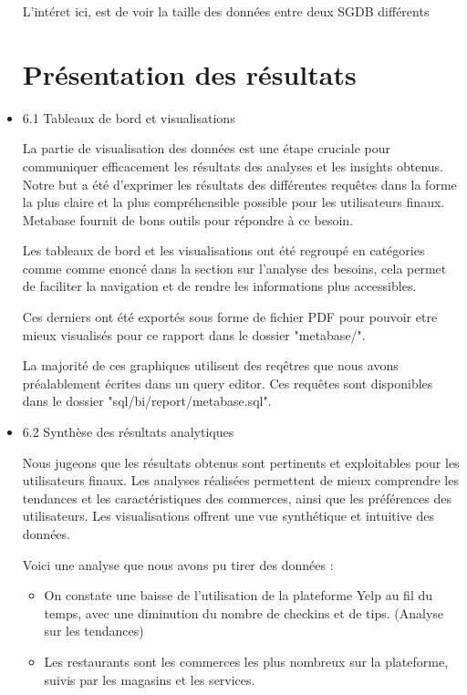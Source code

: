 \begin{itemize}
L'intéret ici, est de voir la taille des données entre deux SGDB différents


\chapter*{Présentation des résultats}


\item 6.1 Tableaux de bord et visualisations

La partie de visualisation des données est une étape cruciale pour communiquer efficacement les résultats des analyses et les insights obtenus.
Notre but a été d'exprimer les résultats des différentes requêtes dans la forme la plus claire et la plus compréhensible possible pour les utilisateurs finaux.
Metabase fournit de bons outils pour répondre à ce besoin.

Les tableaux de bord et les visualisations ont été regroupé en catégories comme comme enoncé dans la section sur l'analyse des besoins, cela permet de faciliter la navigation et de rendre les informations plus accessibles.

Ces derniers ont été exportés sous forme de fichier PDF pour pouvoir etre mieux visualisés pour ce rapport dans le dossier "metabase/".

La majorité de ces graphiques utilisent des reqêtres que nous avons préalablement écrites dans un query editor.
Ces requêtes sont disponibles dans le dossier "sql/bi/report/metabase.sql".

\item 6.2 Synthèse des résultats analytiques

Nous jugeons que les résultats obtenus sont pertinents et exploitables pour les utilisateurs finaux.
Les analyses réalisées permettent de mieux comprendre les tendances et les caractéristiques des commerces, ainsi que les préférences des utilisateurs.
Les visualisations offrent une vue synthétique et intuitive des données.

Voici une analyse que nous avons pu tirer des données :

\begin{itemize}

\item On constate une baisse de l'utilisation de la plateforme Yelp au fil du temps, avec une diminution du nombre de checkins et de tips. (Analyse sur les tendances)

\item Les restaurants sont les commerces les plus nombreux sur la plateforme, suivis par les magasins et les services.


\end{itemize}
\end{itemize}
